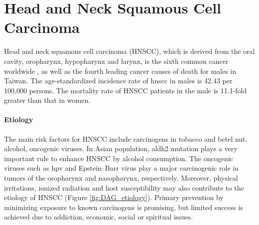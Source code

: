 \documentclass[12pt, a4paper]{article}
\begin{document}







\section*{Head and Neck Squamous Cell Carcinoma}
\label{sec:section}

Head and neck squamous cell carcinoma (HNSCC), which is derived from the oral cavity, oropharynx, hypopharynx and larynx, is the sixth common cancer worldwide \citep{Siegel2016}, as well as the fourth leading cancer causes of death for males in Taiwan\citep{MOHW_death2017}. The age-standardized incidence rate of \acrshort{hnscc} in males is 42.43 per 100,000 persons\citep{MOHW_incidence2018}. The mortality rate of HNSCC patients in the male is 11.1-fold greater than that in women.




\paragraph{Etiology}
The main risk factors for HNSCC include carcinogens in tobacco and betel nut, alcohol, oncogenic viruses.
In Asian population, \acrfull{aldh2} mutation plays a very important rule to enhance HNSCC\citep{Chien2019} by alcohol consumption.
The oncogenic viruses such as \acrfull{hpv} and Epstein–Barr virus play a major carcinogenic role in tumors of the oropharynx and nasopharynx, respectively\citep{Ferrarotto2017}.
Moreover, physical irritations, ionized radiation and host susceptibility may also contribute to the etiology of HNSCC\citep{Ko1995,Znaori2003} (Figure \ref{fig:DAG_etiology}).
Primary prevention by minimizing exposure to known carcinogens is promising, but limited success is achieved due to addiction, economic, social or spiritual issues.
\end{document}
